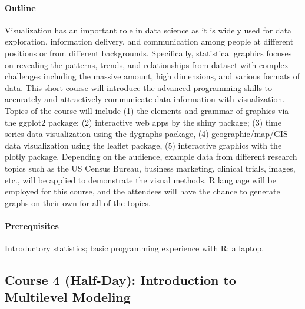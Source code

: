 \documentclass[11pt]{article}
\begin{document}
\paragraph{Outline}
Visualization has an important role in data science as it is widely
used for data exploration, information delivery, and communication
among people at different positions or from different
backgrounds. Specifically, statistical graphics focuses on revealing
the patterns, trends, and relationships from dataset with complex
challenges including the massive amount, high dimensions, and various
formats of data. This short course will introduce the advanced
programming skills to accurately and attractively communicate data
information with visualization. Topics of the course will include (1)
the elements and grammar of graphics via the \textsf{ggplot2} package;
(2) interactive web apps by the \textsf{shiny} package; (3) time series data
visualization using the \textsf{dygraphs} package, (4) geographic/map/GIS data
visualization using the \textsf{leaflet} package, (5) interactive graphics with
the \textsf{plotly} package. Depending on the audience, example data from
different research topics such as the US Census Bureau, business
marketing, clinical trials, images, etc., will be applied to
demonstrate the visual methods. R language will be employed for this
course, and the attendees will have the chance to generate graphs on
their own for all of the topics.

\paragraph{Prerequisites}
Introductory statistics; basic programming experience with R; a laptop.


\subsection*{Course 4 (Half-Day): Introduction to Multilevel Modeling}
\end{document}
